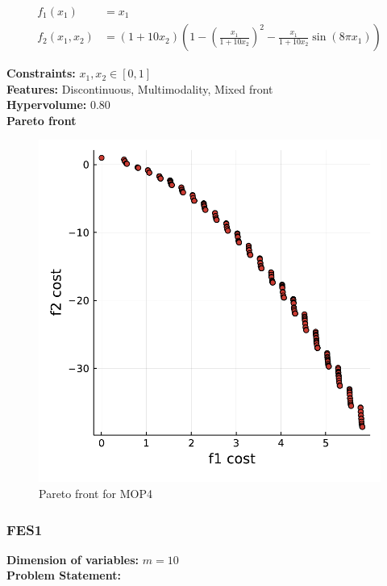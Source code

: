 \documentclass[11pt,oneside,onecolumn,openright]{article}
\begin{document}
  \begin{equation}
  \begin{aligned}
  f_{1}\left(x_{1}\right) &=x_{1} \\
  f_{2}\left(x_{1}, x_{2}\right) &=\left(1+10 x_{2}\right)\left(1-\left(\frac{x_{1}}{1+10 x_{2}}\right)^{2}-\frac{x_{1}}{1+10 x_{2}} \sin \left(8 \pi x_{1}\right)\right)
  \end{aligned}
  \end{equation}

  \noindent\textbf{Constraints: } $x_{1}, x_{2} \in[0,1]$\\
  \noindent\textbf{Features: } Discontinuous, Multimodality, Mixed front\\
  \noindent\textbf{Hypervolume: } 0.80\\
  \noindent\textbf{Pareto front}
      \begin{figure}[H]
      \centering
      \includegraphics[width=12cm]{fig/mop6.pdf}
      \cprotect\caption{Pareto front for MOP4}
      \end{figure}

   \subsubsection{FES1~\cite{huband2006review}}
   \textbf{Dimension of variables: }$m=10$\\
  \noindent\textbf{Problem Statement: }
\end{document}
